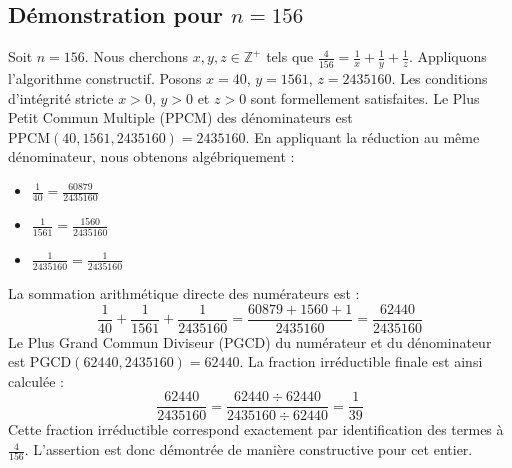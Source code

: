 \documentclass[11pt,a4paper]{article}
\begin{document}
\subsection{Démonstration pour $n = 156$}
Soit $n = 156$. Nous cherchons $x, y, z \in \mathbb{Z}^{+}$ tels que $\frac{4}{156} = \frac{1}{x} + \frac{1}{y} + \frac{1}{z}$.
Appliquons l'algorithme constructif. Posons $x = 40$, $y = 1561$, $z = 2435160$.
Les conditions d'intégrité stricte $x > 0$, $y > 0$ et $z > 0$ sont formellement satisfaites.
Le Plus Petit Commun Multiple (PPCM) des dénominateurs est $\text{PPCM}(40, 1561, 2435160) = 2435160$.
En appliquant la réduction au même dénominateur, nous obtenons algébriquement :
\begin{itemize}
    \item $\frac{1}{40} = \frac{60879}{2435160}$
    \item $\frac{1}{1561} = \frac{1560}{2435160}$
    \item $\frac{1}{2435160} = \frac{1}{2435160}$
\end{itemize}
La sommation arithmétique directe des numérateurs est :
$$ \frac{1}{40} + \frac{1}{1561} + \frac{1}{2435160} = \frac{60879 + 1560 + 1}{2435160} = \frac{62440}{2435160} $$
Le Plus Grand Commun Diviseur (PGCD) du numérateur et du dénominateur est $\text{PGCD}(62440, 2435160) = 62440$.
La fraction irréductible finale est ainsi calculée :
$$ \frac{62440}{2435160} = \frac{62440 \div 62440}{2435160 \div 62440} = \frac{1}{39} $$
Cette fraction irréductible correspond exactement par identification des termes à $\frac{4}{156}$. L'assertion est donc démontrée de manière constructive pour cet entier.
\end{document}
